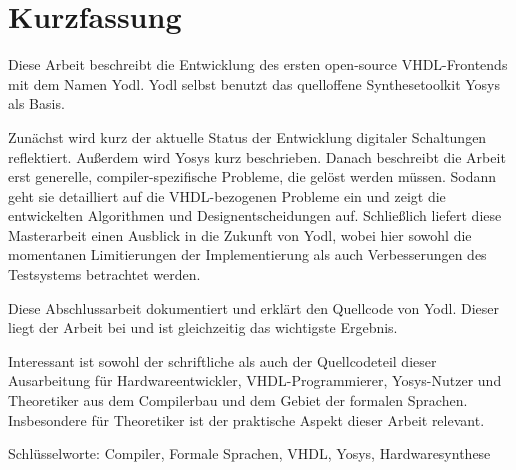 \chapter*{Kurzfassung}
\thispagestyle{empty}

Diese Arbeit beschreibt die Entwicklung des ersten open-source
VHDL-Frontends mit dem Namen Yodl. Yodl selbst benutzt das quelloffene
Synthesetoolkit Yosys als Basis.

Zunächst wird kurz der aktuelle Status der Entwicklung digitaler
Schaltungen reflektiert. Außerdem wird Yosys kurz beschrieben.
Danach beschreibt die Arbeit erst generelle,
compiler-spezifische Probleme, die gelöst werden müssen. Sodann geht
sie detailliert auf die VHDL-bezogenen Probleme ein und zeigt die
entwickelten Algorithmen und Design\-entscheidungen auf. Schließlich
liefert diese Masterarbeit einen Ausblick in die Zukunft von Yodl,
wobei hier
sowohl die momentanen Limitierungen der Implementierung als auch
Verbesserungen des Testsystems betrachtet werden.

Diese Abschlussarbeit dokumentiert und erklärt den Quellcode von
Yodl. Dieser liegt der Arbeit bei und ist gleichzeitig das wichtigste
Ergebnis.

Interessant ist sowohl der schriftliche als auch der Quellcodeteil
dieser Ausarbeitung für Hardwareentwickler, VHDL-Programmierer,
Yosys-Nutzer und Theoretiker aus dem Compilerbau und dem Gebiet der
formalen Sprachen. Insbesondere für Theoretiker ist der praktische
Aspekt dieser Arbeit relevant.

\bigskip

\noindent
Schlüsselworte: Compiler, Formale Sprachen, VHDL, Yosys, Hardwaresynthese